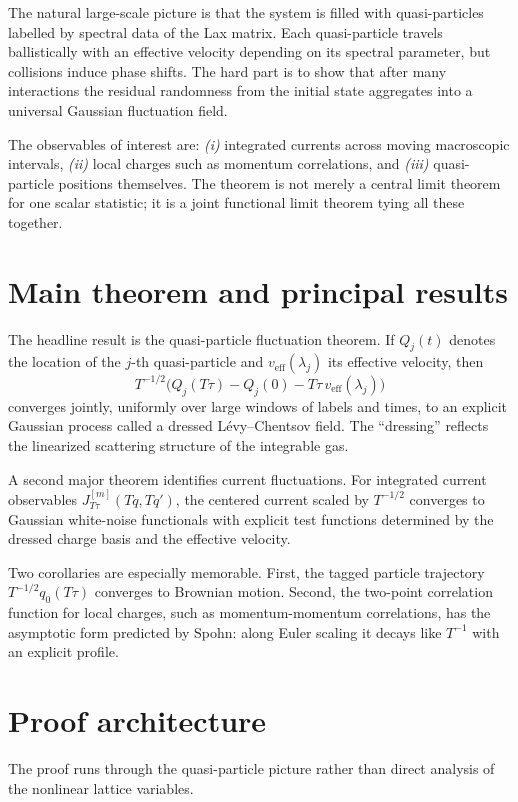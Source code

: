 \documentclass[11pt]{article}
\begin{document}
The natural large-scale picture is that the system is filled with quasi-particles labelled by spectral data of the Lax matrix. Each quasi-particle travels ballistically with an effective velocity depending on its spectral parameter, but collisions induce phase shifts. The hard part is to show that after many interactions the residual randomness from the initial state aggregates into a universal Gaussian fluctuation field.

The observables of interest are: \emph{(i)} integrated currents across moving macroscopic intervals, \emph{(ii)} local charges such as momentum correlations, and \emph{(iii)} quasi-particle positions themselves. The theorem is not merely a central limit theorem for one scalar statistic; it is a joint functional limit theorem tying all these together.

\section*{Main theorem and principal results}
The headline result is the quasi-particle fluctuation theorem. If $Q_j(t)$ denotes the location of the $j$-th quasi-particle and $v_{\mathrm{eff}}(\lambda_j)$ its effective velocity, then
\[
T^{-1/2}\bigl(Q_j(T\tau)-Q_j(0)-T\tau\,v_{\mathrm{eff}}(\lambda_j)\bigr)
\]
converges jointly, uniformly over large windows of labels and times, to an explicit Gaussian process called a dressed L\'evy--Chentsov field. The ``dressing'' reflects the linearized scattering structure of the integrable gas.

A second major theorem identifies current fluctuations. For integrated current observables $J^{[m]}_{T\tau}(Tq,Tq')$, the centered current scaled by $T^{-1/2}$ converges to Gaussian white-noise functionals with explicit test functions determined by the dressed charge basis and the effective velocity.

Two corollaries are especially memorable. First, the tagged particle trajectory $T^{-1/2}q_0(T\tau)$ converges to Brownian motion. Second, the two-point correlation function for local charges, such as momentum-momentum correlations, has the asymptotic form predicted by Spohn: along Euler scaling it decays like $T^{-1}$ with an explicit profile.

\section*{Proof architecture}
The proof runs through the quasi-particle picture rather than direct analysis of the nonlinear lattice variables.
\end{document}
